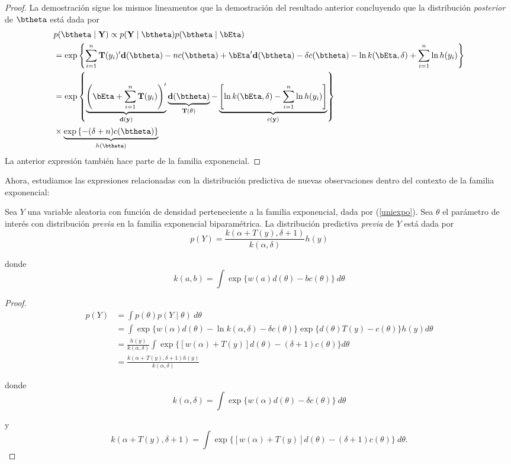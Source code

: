 \documentclass[10pt,openright]{book}\usepackage[]{graphicx}\usepackage[]{color}
\begin{document}
\begin{proof}
La demostración sigue los mismos lineamentos que la demostración del resultado anterior concluyendo que la distribución \emph{posterior} de $\btheta$ está dada por
\begin{align*}
&p(\btheta \mid \mathbf{Y}) \propto p(\mathbf{Y} \mid \btheta)p(\btheta \mid \bEta)\\
&= \exp\left\{\sum_{i=1}^n\mathbf{T}(y_i)'\mathbf{d}(\btheta) - nc(\btheta) + \bEta' \mathbf{d}(\btheta) - \delta c(\btheta) - \ln k(\bEta,\delta) +\sum_{i=1}^n\ln h(y_i)\right\}\\
& =\exp\left\{\underbrace{\left(\bEta+\sum_{i=1}^n\mathbf{T}(y_i)\right)'}_{\mathbf{d}(\mathbf{y})}
\underbrace{\mathbf{d}(\btheta)}_{\mathbf{T}(\theta)} - \underbrace{\left[\ln k(\bEta,\delta)-\sum_{i=1}^n\ln h(y_i)\right]}_{c(\mathbf{y})}\right\} \\
&  \times \underbrace{\exp\left\{-(\delta+n)c(\btheta)\right\}}_{h(\btheta)}
\end{align*}
La anterior expresión también hace parte de la familia exponencial.
\end{proof}

Ahora, estudiamos las expresiones relacionadas con la distribución predictiva de nuevas observaciones dentro del contexto de la familia exponencial:
\begin{Res}
Sea $Y$ una variable aleatoria con función de densidad perteneciente a la familia exponencial, dada por (\ref{uniexpo}). Sea $\theta$ el parámetro de interés con distribución \emph{previa} en la familia exponencial biparamétrica. La distribución predictiva \emph{previa} de $Y$ está dada por
\begin{equation}
p(Y)=\frac{k(\alpha+T(y),\delta+1)}{k(\alpha,\delta)}h(y)
\end{equation}

donde 
\begin{equation*}
k(a,b)=\int \exp\{w(a) d(\theta)-b c(\theta)\}\ d\theta
\end{equation*}
\end{Res}

\begin{proof}
\begin{align*}
p(Y)&=\int p(\theta)p(Y \mid \theta)\ d\theta\\
&=\int \exp\{w(\alpha) d(\theta)-\ln k(\alpha,\delta)-\delta c(\theta)\}\exp\{d(\theta)T(y)-c(\theta)\}h(y)d\theta\\
&=\frac{h(y)}{k(\alpha,\delta)}\int \exp\{[w(\alpha)+T(y)]d(\theta)-(\delta+1)c(\theta)\}d\theta\\
&=\frac{k(\alpha+T(y),\delta+1)h(y)}{k(\alpha,\delta)}
\end{align*}

donde
\begin{equation*}
k(\alpha,\delta)=\int \exp\{w(\alpha) d(\theta)-\delta c(\theta)\}\ d\theta
\end{equation*}

y
\begin{equation*}
k(\alpha+T(y),\delta+1)=\int \exp\{[w(\alpha)+T(y)]d(\theta)-(\delta+1)c(\theta)\} \ d\theta.
\end{equation*}
\end{proof}
\end{document}
